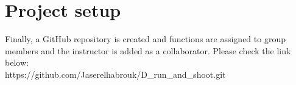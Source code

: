 \documentclass[a4paper, 11pt, oneside]{article}
\begin{document}




\section{Project setup}
Finally, a GitHub repository is created and functions are assigned to group members and the instructor is added as a collaborator. Please check the link below:\\ https://github.com/Jaserelhabrouk/D\_run\_and\_shoot.git
\end{document}
